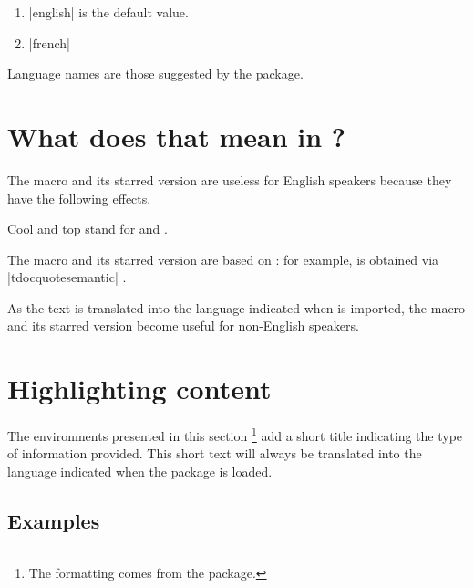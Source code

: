 \begin{enumerate}
    \item \tdocinlatex|english| is the default value.

    \item \tdocinlatex|french|
\end{enumerate}


\begin{tdocnote}
    Language names are those suggested by the  package.
\end{tdocnote}


\section{What does that mean in ?}

The macro  and its starred version are useless for English speakers because they have the following effects.


\begin{tdoclatex}
Cool and top stand for  and .
\end{tdoclatex}


The macro  and its starred version are based on  : for example,  is obtained via \tdocinlatex|tdocquote{semantic}| .


\begin{tdocnote}
    As the text  is translated into the language indicated when \thispack{} is imported, the macro  and its starred version become useful for non-English speakers.
\end{tdocnote}


\section{Highlighting content}

\begin{tdocnote}
    The environments presented in this section
    \footnote{
        The formatting comes from the  package.
    }
    add a short title indicating the type of information provided.
    This short text will always be translated into the language indicated when the \thispack{} package is loaded.
\end{tdocnote}



\subsection{Examples}

